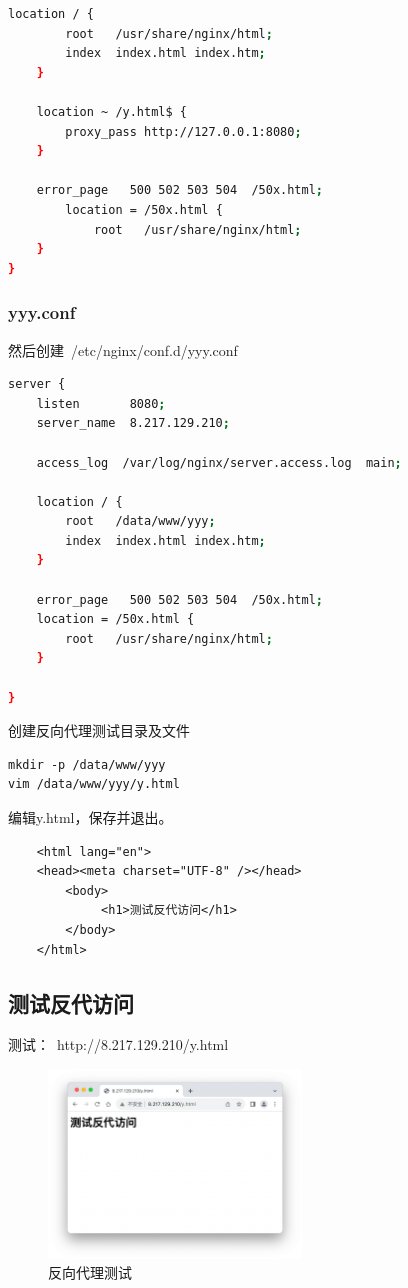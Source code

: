 \documentclass[12pt, a4paper]{article} %
\renewcommand{\figurename}{图} %
\renewcommand{\lstlistingname}{代码} %
\begin{document}
\begin{CJK*}{UTF8}{gbsn}
\begin{lstlisting}[language=bash, caption=xxx.conf]
    location / {
        root   /usr/share/nginx/html;
        index  index.html index.htm;
    }

    location ~ /y.html$ {
        proxy_pass http://127.0.0.1:8080;
    }

    error_page   500 502 503 504  /50x.html;
        location = /50x.html {
            root   /usr/share/nginx/html;
    }
}
\end{lstlisting}

\subsubsection{yyy.conf}
然后创建~/etc/nginx/conf.d/yyy.conf~
\renewcommand{\lstlistingname}{配置代码} %
\begin{lstlisting}[language=bash, caption=yyy.conf]
server {
    listen       8080;
    server_name  8.217.129.210;

    access_log  /var/log/nginx/server.access.log  main;

    location / {
        root   /data/www/yyy;
        index  index.html index.htm;
    }

    error_page   500 502 503 504  /50x.html;
    location = /50x.html {
        root   /usr/share/nginx/html;
    }

}
\end{lstlisting}

创建反向代理测试目录及文件
\begin{lstlisting}
mkdir -p /data/www/yyy
vim /data/www/yyy/y.html
\end{lstlisting}
编辑y.html，保存并退出。
\begin{verbatim}
    <html lang="en">
    <head><meta charset="UTF-8" /></head>
        <body>
             <h1>测试反代访问</h1>
        </body>
    </html>
\end{verbatim}

\clearpage
\subsection{测试反代访问}
测试：~http://8.217.129.210/y.html~
\renewcommand{\figurename}{图} %
\begin{figure}[htbp]
    \centering
    \includegraphics[width=0.6\textwidth]{./imgs/catch2023-08-25-08.52.45.png}
    \caption{反向代理测试}
\end{figure}


\end{CJK*}
\end{document}
